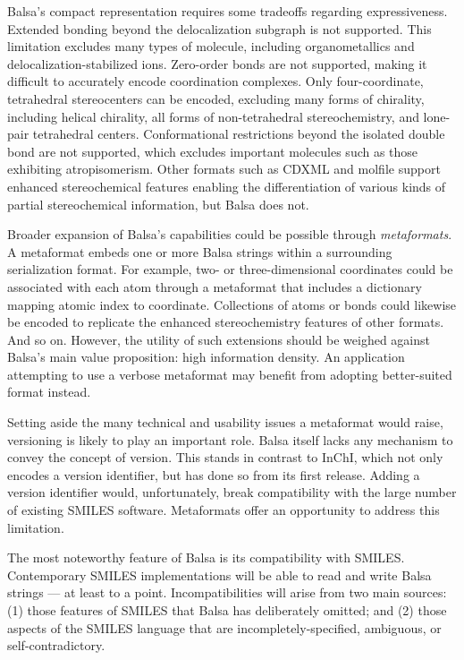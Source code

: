 \documentclass{article}
\begin{document}
Balsa's compact representation requires some tradeoffs regarding expressiveness. Extended bonding beyond the delocalization subgraph is not supported. This limitation excludes many types of molecule, including organometallics and delocalization-\-stabilized ions. Zero-\-order bonds are not supported, making it difficult to accurately encode coordination complexes. Only four-\-coordinate, tetrahedral stereocenters can be encoded, excluding many forms of chirality, including helical chirality, all forms of non-\-tetrahedral stereochemistry, and lone-\-pair tetrahedral centers. Conformational restrictions beyond the isolated double bond are not supported, which excludes important molecules such as those exhibiting atropisomerism. Other formats such as CDXML and molfile support enhanced stereochemical features enabling the differentiation of various kinds of partial stereochemical information, but Balsa does not.

Broader expansion of Balsa's capabilities could be possible through \textit{metaformats}. A metaformat embeds one or more Balsa strings within a surrounding serialization format. For example, two- or three-dimensional coordinates could be associated with each atom through a metaformat that includes a dictionary mapping atomic index to coordinate. Collections of atoms or bonds could likewise be encoded to replicate the enhanced stereochemistry features of other formats. And so on. However, the utility of such extensions should be weighed against Balsa's main value proposition: high information density. An application attempting to use a verbose metaformat may benefit from adopting better-suited format instead.

Setting aside the many technical and usability issues a metaformat would raise, versioning is likely to play an important role. Balsa itself lacks any mechanism to convey the concept of version. This stands in contrast to InChI, which not only encodes a version identifier, but has done so from its first release. Adding a version identifier would, unfortunately, break compatibility with the large number of existing SMILES software. Metaformats offer an opportunity to address this limitation.

The most noteworthy feature of Balsa is its compatibility with SMILES. Contemporary SMILES implementations will be able to read and write Balsa strings --- at least to a point. Incompatibilities will arise from two main sources: (1) those features of SMILES that Balsa has deliberately omitted; and (2) those aspects of the SMILES language that are incompletely-specified, ambiguous, or self-contradictory.
\end{document}
